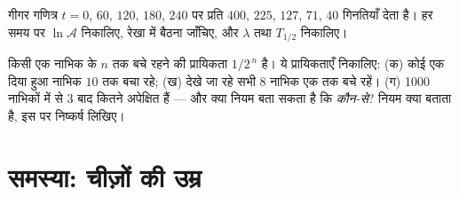\begin{exercise}[$\star\star\star$]\label{exo:g12:radioactive-decay:14}
गीगर गणित्र $t = 0$, $60$, $120$, $180$, $240$  पर प्रति 
$400$, $225$, $127$, $71$, $40$ गिनतियाँ देता है। हर समय पर $\ln \mathcal A$
निकालिए, रेखा में बैठना जाँचिए, और $\lambda$ तथा $T_{1/2}$ निकालिए।
\end{exercise}

\begin{exercise}[$\star\star\star$]\label{exo:g12:radioactive-decay:15}
किसी एक नाभिक के $n$  तक बचे रहने की प्रायिकता $1/2^{\,n}$
है। ये प्रायिकताएँ निकालिए: (क) कोई एक दिया हुआ नाभिक $10$ 
तक बचा रहे; (ख) देखे जा रहे सभी $8$ नाभिक एक  तक बचे रहें।
(ग) \num{1000} नाभिकों में से $3$  बाद कितने अपेक्षित हैं --- और क्या
नियम बता सकता है कि \emph{कौन-से}? नियम क्या बताता है, इस पर निष्कर्ष लिखिए।
\end{exercise}

\section{समस्या: चीज़ों की उम्र}

